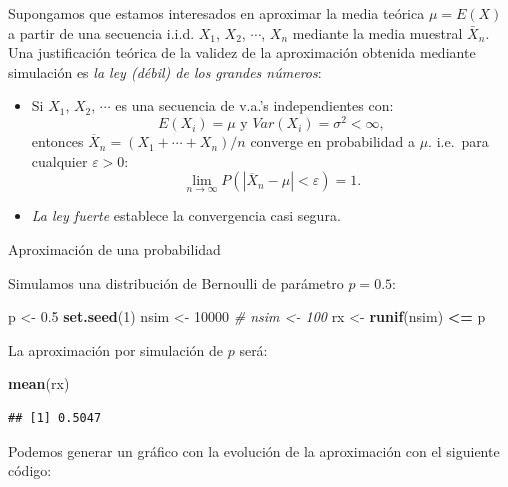 \documentclass[
]{book}
\newenvironment{Shaded}{\begin{snugshade}}{\end{snugshade}}
\newcommand{\CommentTok}[1]{\textcolor[rgb]{0.56,0.35,0.01}{\textit{#1}}}
\newcommand{\DecValTok}[1]{\textcolor[rgb]{0.00,0.00,0.81}{#1}}
\newcommand{\FloatTok}[1]{\textcolor[rgb]{0.00,0.00,0.81}{#1}}
\newcommand{\KeywordTok}[1]{\textcolor[rgb]{0.13,0.29,0.53}{\textbf{#1}}}
\newcommand{\NormalTok}[1]{#1}
\newcommand{\OperatorTok}[1]{\textcolor[rgb]{0.81,0.36,0.00}{\textbf{#1}}}
\newcommand{\StringTok}[1]{\textcolor[rgb]{0.31,0.60,0.02}{#1}}
\theoremstyle{break}
\theoremstyle{definition}
\theoremstyle{definition}
\theoremstyle{definition}
\theoremstyle{remark}
\let\BeginKnitrBlock\begin \let\EndKnitrBlock\end
\begin{document}
Supongamos que estamos interesados en aproximar la media teórica
\(\mu = E\left( X\right)\) a partir de una secuencia i.i.d. \(X_{1}\),
\(X_{2}\), \(\cdots\), \(X_{n}\) mediante la media muestral \(\bar{X}_{n}\).
Una justificación teórica de la validez de la aproximación obtenida
mediante simulación es \emph{la ley (débil) de los grandes números}:

\begin{itemize}
\item
  Si \(X_{1}\), \(X_{2}\), \(\cdots\) es una secuencia de v.a.'s
  independientes con:
  \[E\left( X_{i}\right) =\mu \text{ y }Var\left( X_{i}\right) 
  =\sigma^{2}<\infty,\]
  entonces \(\overline{X}_{n}=\left( X_{1}+\cdots +X_{n}\right) /n\)
  converge en probabilidad a \(\mu\). i.e.~para cualquier \(\varepsilon >0\):
  \[\lim\limits_{n\rightarrow \infty }P\left( \left\vert \overline{X}_{n}-\mu
  \right\vert <\varepsilon \right) = 1.\]
\item
  \emph{La ley fuerte} establece la convergencia casi segura.
\end{itemize}

\BeginKnitrBlock{example}
\protect\hypertarget{exm:unnamed-chunk-2}{}{\label{exm:unnamed-chunk-2} }Aproximación de una probabilidad
\EndKnitrBlock{example}

Simulamos una distribución de Bernoulli de parámetro \(p=0.5\):

\begin{Shaded}
\begin{Highlighting}[]
\NormalTok{p <-}\StringTok{ }\FloatTok{0.5}
\KeywordTok{set.seed}\NormalTok{(}\DecValTok{1}\NormalTok{)}
\NormalTok{nsim <-}\StringTok{ }\DecValTok{10000}
\CommentTok{# nsim <- 100}
\NormalTok{rx <-}\StringTok{ }\KeywordTok{runif}\NormalTok{(nsim) }\OperatorTok{<=}\StringTok{ }\NormalTok{p}
\end{Highlighting}
\end{Shaded}

La aproximación por simulación de \(p\) será:

\begin{Shaded}
\begin{Highlighting}[]
\KeywordTok{mean}\NormalTok{(rx) }
\end{Highlighting}
\end{Shaded}

\begin{verbatim}
## [1] 0.5047
\end{verbatim}

Podemos generar un gráfico con la evolución de la aproximación con el siguiente código:
\end{document}
